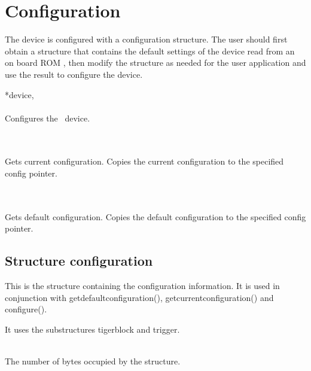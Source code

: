 	\section{Configuration}

		The device is configured with a configuration structure. 
		The user should first obtain a structure that contains the default settings of the device read from an on board ROM , 
		then modify the structure as needed for the user application and use the result to configure the device.\par

		 {*device,} \\ \\
		Configures the \deviceName\ device.\par

		 \\ \\
		Gets current configuration. Copies the current configuration to the specified config pointer.\par

		 \\ \\
		Gets default configuration. Copies the default configuration to the specified config pointer.\par

		\subsection{Structure \prefix configuration}

			This is the structure containing the configuration information. It is used in conjunction with \textsf{\prefix get\tu default\tu configuration()}, \textsf{\prefix get\tu current\tu configuration()} and \textsf{\prefix configure()}.\par

			It uses the substructures \textsf{\prefix tiger\tu block} and \textsf{\prefix trigger}.\par

			\\
			The number of bytes occupied by the structure.\par

